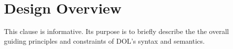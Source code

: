 \documentclass[10pt,%
\ifpretendfinal
final%
\else
draft%
\fi,
]{scrreprt}
\makeatletter
\newcommand*\CommentAuthor{}
\renewcommand*\CommentAuthor{#1}}
\newcommand*\CommentDate{}
\renewcommand*\CommentDate{#1}}
\newcommand*\CommentId{}
\renewcommand*\CommentId{#1}}
\newcommand*\CommentType{}
\renewcommand*\CommentType{#1}}
\newcommand*{\SetCommentColorByType}[1]{%
\edef\localType{{#1}}%
\expandafter\ifstrequal\localType{q-aut}{\colorlet{CommentColor}{red}}{%
\expandafter\ifstrequal\localType{q-all}{\colorlet{CommentColor}{orange}}{%
\expandafter\ifstrequal\localType{todo}{\colorlet{CommentColor}{orange}}{%
\expandafter\ifstrequal\localType{fyi}{\colorlet{CommentColor}{lightgray}}{%
\colorlet{CommentColor}{yellow}}}}}}
\newcommand*{\SetCommentPrefixByType}[1]{%
\edef\localType{{#1}}%
\expandafter\@ifmtarg\localType{%
\edef\CommentPrefix{}%
}{%
\caseupper[q]{#1}%
\edef\CommentPrefix{\thestring: }%
}}
\newcommand*{\initComment}[1]{%
\setkeys{Comment}{#1}%
\SetCommentColorByType{\CommentType}%
\relax%
\SetCommentPrefixByType{\CommentType}%
\relax%
}
\newcommand*{\todonote}[2][]{%
\initComment{#1}%
\pdfcomment[author=\CommentAuthor,color=CommentColor,date=\CommentDate,id=\CommentId]{%
\CommentPrefix
#2}}
\renewcommand*{\todonote}[2][]{%
\initComment{#1}%
\ednote{\CommentPrefix #2}}
\newcommand*{\CLnote}[2][author=Christoph Lange]{%
\todonote[author=Christoph Lange,#1]{#2} 
}
\newcommand*{\shall}{\textbf{shall}\xspace}
\newcommand*{\should}{\textbf{should}\xspace}
\newcommand*{\IS}{OMG Specification\xspace}
\makeatother
\begin{document}
\chapter{Design Overview}
%
%
%
%
This clause is informative. Its purpose is to briefly describe the 
the overall guiding principles and constraints of DOL's syntax and semantics.
%
%
%
%
%
%
%
\end{document}
